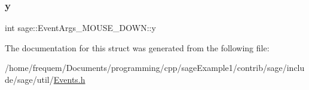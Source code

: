 \mbox{\label{structsage_1_1EventArgs__MOUSE__DOWN_a71c221fa2b259e4bec5b9b6f6c4ee5ac}} 
\subsubsection{\texorpdfstring{y}{y}}
{\footnotesize\ttfamily int sage\+::\+Event\+Args\+\_\+\+M\+O\+U\+S\+E\+\_\+\+D\+O\+W\+N\+::y}



The documentation for this struct was generated from the following file\+:\begin{DoxyCompactItemize}
\item 
/home/frequem/\+Documents/programming/cpp/sage\+Example1/contrib/sage/include/sage/util/\mbox{\hyperlink{Events_8h}{Events.\+h}}\end{DoxyCompactItemize}
